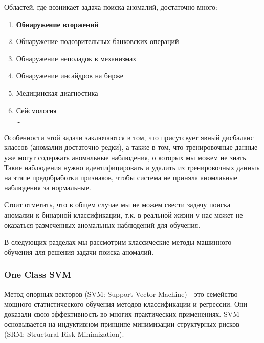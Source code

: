 \documentclass[12pt]{article}
\begin{document}
    \par Областей, где возникает задача поиска аномалий, достаточно много:

    \begin{enumerate}
        \item \textbf{Обнаружение вторжений}
        \item Обнаружение подозрительных банковских операций
         \item Обнаружение неполадок в механизмах
        \item Обнаружение инсайдров на бирже
        \item Медицинская диагностика
        \item Сейсмология \\
        \ldots
    \end{enumerate}

    \par Особенности этой задачи заключаются в том, что присутсвует явный дисбаланс классов (аномалии достаточно редки), а также в том, что тренировочные данные уже могут содержать аномальные наблюдения, о которых мы можем не знать. Такие наблюдения нужно идентифицировать и удалить из тренировочных данныъ на этапе предобработки признаков, чтобы система не приняла аномлаьные наблюдения за нормальные. \\
    
    \par Стоит отметить, что в общем случае мы не можем свести задачу поиска аномалии к бинарной классификации, т.к. в реальной жизни у нас может не оказаться размеченных аномальных наблюдений для обучения. \\

    \par В следующих разделах мы рассмотрим классические методы машинного обучения для решения задачи поиска аномалий.

    \newpage


    \subsubsection{One Class SVM}
    \label{sec:Research:Model:OneClassSVM}

    \par Метод опорных векторов (SVM: Support Vector Machine) - это семейство мощного статистического обучения методов классификации и регрессии. Они доказали свою эффективность во многих практических применениях. SVM основывается на индуктивном принципе минимизации структурных рисков (SRM: Structural Risk Minimization). \\
\end{document}
